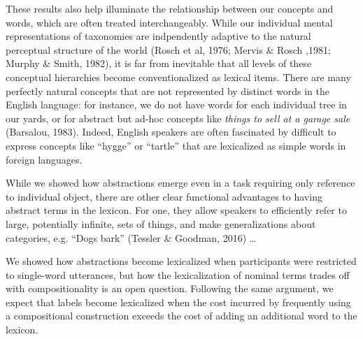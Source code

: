 \documentclass[10pt,letterpaper]{article}
\begin{document}
These results also help illuminate the relationship between our concepts and words, which are often treated interchangeably. While our individual mental representations of taxonomies are indpendently adaptive to the natural perceptual structure of the world (Rosch et al, 1976; Mervis \& Rosch ,1981; Murphy \& Smith, 1982), it is far from inevitable that all levels of these conceptual hierarchies become conventionalized as lexical items. There are many perfectly natural concepts that are not represented by distinct words in the English language: for instance, we do not have words for each individual tree in our yards, or for abstract but ad-hoc concepts like \emph{things to sell at a garage sale} (Barsalou, 1983). Indeed, English speakers are often fascinated by difficult to express concepts like ``hygge'' or ``tartle'' that are lexicalized as simple words in foreign languages.

While we showed how abstractions emerge even in a task requiring only reference to individual object, there are other clear functional advantages to having abstract terms in the lexicon. For one, they allow speakers to efficiently refer to large, potentially infinite, sets of things, and make generalizations about categories, e.g. ``Dogs bark'' (Tessler \& Goodman, 2016) \dots



We showed how abstractions become lexicalized when participants were restricted to single-word utterances, but how the lexicalization of nominal terms trades off with compositionality is an open question. Following the same argument, we expect that labels become lexicalized when the cost incurred by frequently using a compositional construction exceeds the cost of adding an additional word to the lexicon. 
\end{document}
